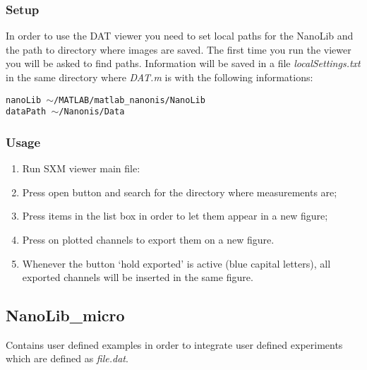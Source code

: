 \subsubsection*{Setup}
In order to use the DAT viewer you need to set local paths for the NanoLib and the path to directory where images are saved.
The first time you run the viewer you will be asked to find paths. 
Information will be saved in a file \emph{localSettings.txt} in the same directory  where \emph{DAT.m} is with the following informations:\\
\begin{minipage}{\textwidth}
	\setlength{\parindent}{15pt}
	\texttt{nanoLib	$\sim$/MATLAB/matlab\_nanonis/NanoLib}\\
	\indent \texttt{dataPath	$\sim$/Nanonis/Data}
\end{minipage}

\subsubsection*{Usage}
\begin{enumerate}
	\item Run SXM viewer main file: \\ 
	\item Press open button and search for the directory where measurements are;
	\item Press items in the list box in order to let them appear in a new figure;
	\item Press on plotted channels to export them on a new figure.
	\item Whenever the button ‘hold exported’ is active (blue capital letters), all exported channels will be inserted in the same figure.
\end{enumerate}

\subsection{NanoLib\_micro}
\label{nanolib::user}

Contains user defined examples in order to integrate user defined experiments which are defined as \emph{file.dat}.